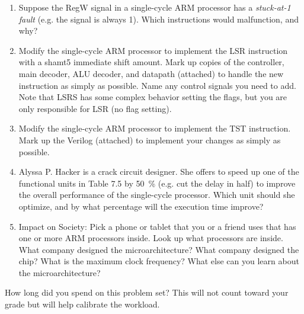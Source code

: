 \documentclass{e85}
\date{2019 April 17 (Wednesday)}
\author{}
\begin{document}
\begin{enumerate}
\item Suppose the RegW signal in a single-cycle ARM processor has a
  \emph{stuck-at-1 fault} (e.g. the signal is always 1).  Which
  instructions would malfunction, and why?

  \begin{solution}
  \end{solution}

\item Modify the single-cycle ARM processor to implement the LSR
  instruction with a shamt5 immediate shift amount.  Mark up copies of
  the controller, main decoder, ALU decoder, and datapath (attached)
  to handle the new instruction as simply as possible.  Name any
  control signals you need to add.  Note that LSRS has some complex
  behavior setting the flags, but you are only responsible for LSR (no
  flag setting).

  \begin{solution}
  \end{solution}

\item Modify the single-cycle ARM processor to implement the TST
  instruction.  Mark up the Verilog (attached) to implement your
  changes as simply as possible.

  \begin{solution}
  \end{solution}

\item Alyssa P. Hacker is a crack circuit designer.  She offers to
  speed up one of the functional units in Table 7.5 by
  \SI{50}{\percent} (e.g. cut the delay in half) to improve the
  overall performance of the single-cycle processor.  Which unit
  should she optimize, and by what percentage will the execution time
  improve?

  \begin{solution}
  \end{solution}

\item Impact on Society: Pick a phone or tablet that you or a friend
  uses that has one or more ARM processors inside.  Look up what
  processors are inside.  What company designed the microarchitecture?
  What company designed the chip?  What is the maximum clock
  frequency?  What else can you learn about the microarchitecture?

  \begin{solution}
  \end{solution}
\end{enumerate}

How long did you spend on this problem set?  This will not count
toward your grade but will help calibrate the workload.
\begin{solution}
\end{solution}
\end{document}

